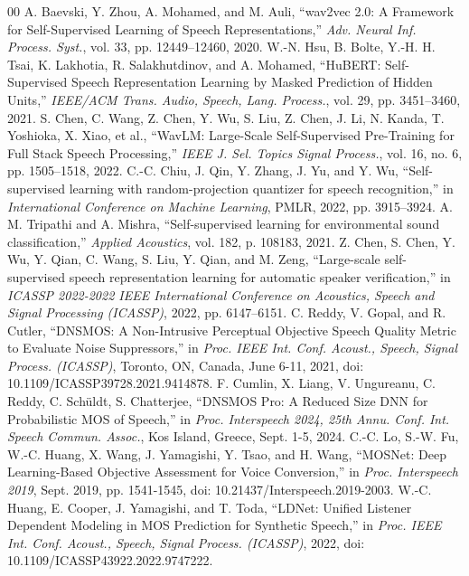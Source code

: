 \documentclass[conference]{IEEEtran}
\begin{document}
\begin{thebibliography}{00}
 A. Baevski, Y. Zhou, A. Mohamed, and M. Auli, ``wav2vec 2.0: A Framework for Self-Supervised Learning of Speech Representations,'' \textit{Adv. Neural Inf. Process. Syst.}, vol. 33, pp. 12449--12460, 2020.
 W.-N. Hsu, B. Bolte, Y.-H. H. Tsai, K. Lakhotia, R. Salakhutdinov, and A. Mohamed, ``HuBERT: Self-Supervised Speech Representation Learning by Masked Prediction of Hidden Units,'' \textit{IEEE/ACM Trans. Audio, Speech, Lang. Process.}, vol. 29, pp. 3451--3460, 2021.
 S. Chen, C. Wang, Z. Chen, Y. Wu, S. Liu, Z. Chen, J. Li, N. Kanda, T. Yoshioka, X. Xiao, et al., ``WavLM: Large-Scale Self-Supervised Pre-Training for Full Stack Speech Processing,'' \textit{IEEE J. Sel. Topics Signal Process.}, vol. 16, no. 6, pp. 1505--1518, 2022.
 C.-C. Chiu, J. Qin, Y. Zhang, J. Yu, and Y. Wu, ``Self-supervised learning with random-projection quantizer for speech recognition,'' in \textit{International Conference on Machine Learning}, PMLR, 2022, pp. 3915--3924.
 A. M. Tripathi and A. Mishra, ``Self-supervised learning for environmental sound classification,'' \textit{Applied Acoustics}, vol. 182, p. 108183, 2021.
 Z. Chen, S. Chen, Y. Wu, Y. Qian, C. Wang, S. Liu, Y. Qian, and M. Zeng, ``Large-scale self-supervised speech representation learning for automatic speaker verification,'' in \textit{ICASSP 2022-2022 IEEE International Conference on Acoustics, Speech and Signal Processing (ICASSP)}, 2022, pp. 6147--6151.
 C. Reddy, V. Gopal, and R. Cutler, ``DNSMOS: A Non-Intrusive Perceptual Objective Speech Quality Metric to Evaluate Noise Suppressors,'' in \textit{Proc. IEEE Int. Conf. Acoust., Speech, Signal Process. (ICASSP)}, Toronto, ON, Canada, June 6-11, 2021, doi: 10.1109/ICASSP39728.2021.9414878.
 F. Cumlin, X. Liang, V. Ungureanu, C. Reddy, C. Sch\"uldt, S.  Chatterjee, ``DNSMOS Pro: A Reduced Size DNN for Probabilistic MOS of Speech,'' in \textit{Proc. Interspeech 2024, 25th Annu. Conf. Int. Speech Commun. Assoc.}, Kos Island, Greece, Sept. 1-5, 2024.
 C.-C. Lo, S.-W. Fu, W.-C. Huang, X. Wang, J. Yamagishi, Y. Tsao, and H. Wang, ``MOSNet: Deep Learning-Based Objective Assessment for Voice Conversion,'' in \textit{Proc. Interspeech 2019}, Sept. 2019, pp. 1541-1545, doi: 10.21437/Interspeech.2019-2003.
 W.-C. Huang, E. Cooper, J. Yamagishi, and T. Toda, ``LDNet: Unified Listener Dependent Modeling in MOS Prediction for Synthetic Speech,'' in \textit{Proc. IEEE Int. Conf. Acoust., Speech, Signal Process. (ICASSP)}, 2022, doi: 10.1109/ICASSP43922.2022.9747222.

\end{thebibliography}
\end{document}
